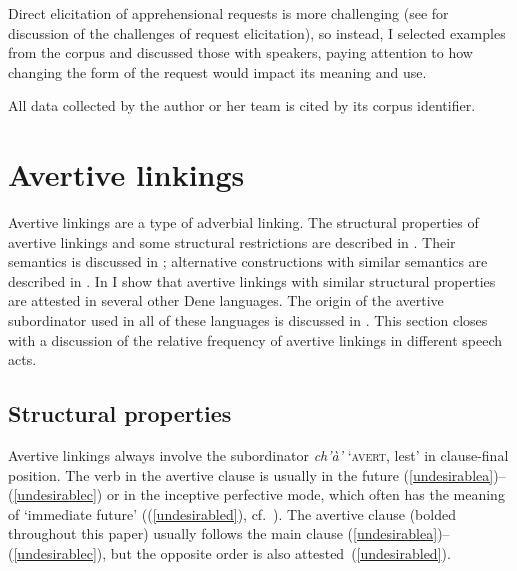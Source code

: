 \documentclass[output=paper,colorlinks,citecolor=brown
]{langscibook}
\begin{document}
Direct elicitation of apprehensional requests is more challenging (see \citealt{LovickO2016, LovickOTuttleS2019} for discussion of the challenges of request elicitation), so instead, I selected examples from the corpus and discussed those with speakers, paying attention to how changing the form of the request would impact its meaning and use. 

All data collected by the author or her team is cited by its corpus identifier.

\section{Avertive linkings}
\label{section:avertive}

Avertive linkings are a type of adverbial linking. The structural properties of avertive linkings and some structural restrictions are described in . Their semantics is discussed in ; alternative constructions with similar semantics are described in . In  I show that avertive linkings with similar structural properties are attested in several other Dene languages. The origin of the avertive subordinator used in all of these languages is discussed in . This section closes with a discussion of the relative frequency of avertive linkings in different speech acts.


\subsection{Structural properties}
\label{subsection:avertive-structure}

Avertive linkings always involve the subordinator \textit{ch'à'} `\textsc{avert}, lest' in clause-final position. The verb in the avertive clause is usually in the future (\ref{undesirablea})--(\ref{undesirablec}) or in the inceptive perfective mode, which often has the meaning of `immediate future' ((\ref{undesirabled}), cf.\  \citealt{LovickO2017}). The avertive clause (bolded throughout this paper) usually follows the main clause (\ref{undesirablea})--(\ref{undesirablec}), but the opposite order is also attested~(\ref{undesirabled}). 
\end{document}
